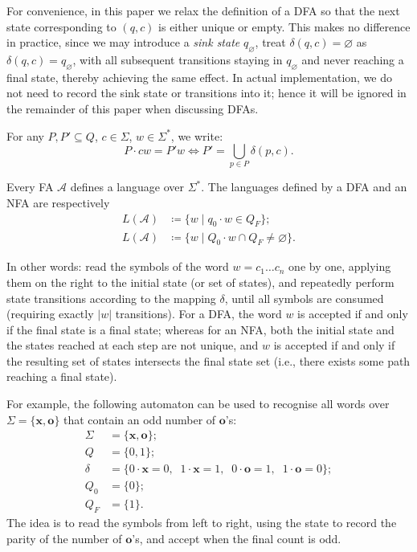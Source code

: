 \documentclass[11pt]{article}
\theoremstyle{definition}
\theoremstyle{plain}
\newcommand{\varA}{\mathcal{A}}
\newcommand{\x}{\mathbf{x}}
\newcommand{\e}{\mathbf{o}}
\begin{document}
For convenience, in this paper we relax the definition of a DFA so that the next state corresponding to $(q, c)$ is either unique or empty.
This makes no difference in practice, since we may introduce a \textit{sink state} $q_{\varnothing}$,
treat $\delta(q, c)=\varnothing$ as $\delta(q, c)=q_{\varnothing}$, with all subsequent transitions staying in $q_{\varnothing}$ and never reaching a final state, thereby achieving the same effect.
In actual implementation, we do not need to record the sink state or transitions into it; hence it will be ignored in the remainder of this paper when discussing DFAs.

For any $P, P'\subseteq Q$, $c\in \varSigma$, $w\in\varSigma^*$, we write:
\[
    P\cdot c w = P' w \iff P' = \bigcup_{p\in P} \delta(p, c).
\]

Every FA $\varA$ defines a language over $\varSigma^*$. The languages defined by a DFA and an NFA are respectively
\begin{align*}
    L(\varA) &\coloneq \{w \mid q_0 \cdot w \in Q_F\};\\
    L(\varA) &\coloneq \{w \mid Q_0 \cdot w \cap Q_F \neq \varnothing\}.
\end{align*}

In other words: read the symbols of the word $w= c_1 \ldots c_n$ one by one, applying them on the right to the initial state (or set of states),
and repeatedly perform state transitions according to the mapping $\delta$, until all symbols are consumed (requiring exactly $|w|$ transitions).
For a DFA, the word $w$ is accepted if and only if the final state is a final state;
whereas for an NFA, both the initial state and the states reached at each step are not unique, and $w$ is accepted if and only if the resulting set of states intersects the final state set (i.e., there exists some path reaching a final state).

For example, the following automaton can be used to recognise all words over $\varSigma=\{\x, \e\}$ that contain an odd number of $\e$'s:
\begin{align*}
    \varSigma &= \{\x, \e\}; \\
    Q         &= \{0, 1\}; \\
    \delta    &= \{0\cdot \x = 0,\;\; 1\cdot \x = 1,\;\; 0\cdot \e = 1,\;\; 1\cdot \e = 0\}; \\
    Q_0       &= \{0\}; \\
    Q_F       &= \{1\}.
\end{align*}
The idea is to read the symbols from left to right, using the state to record the parity of the number of $\e$'s, and accept when the final count is odd.
\end{document}

